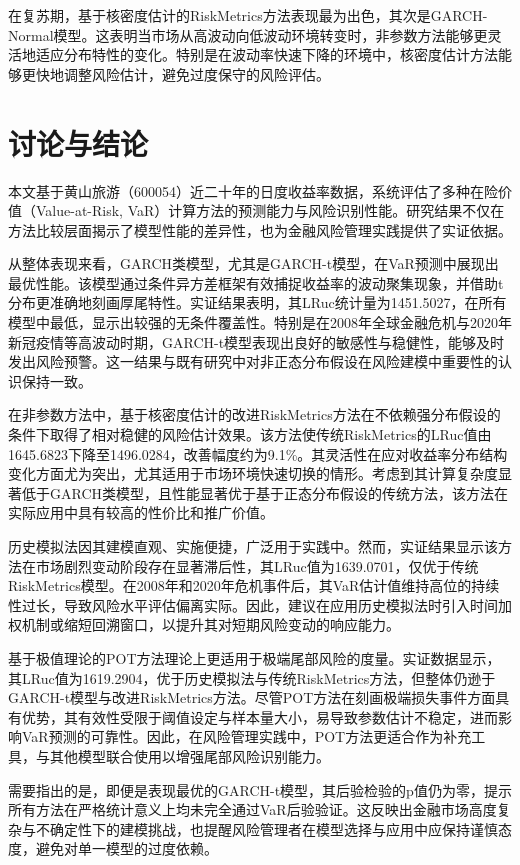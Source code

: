 \documentclass[12pt, a4paper]{article}
\begin{document}
在复苏期，基于核密度估计的RiskMetrics方法表现最为出色，其次是GARCH-Normal模型。这表明当市场从高波动向低波动环境转变时，非参数方法能够更灵活地适应分布特性的变化。特别是在波动率快速下降的环境中，核密度估计方法能够更快地调整风险估计，避免过度保守的风险评估。

\section{讨论与结论}

本文基于黄山旅游（600054）近二十年的日度收益率数据，系统评估了多种在险价值（Value-at-Risk, VaR）计算方法的预测能力与风险识别性能。研究结果不仅在方法比较层面揭示了模型性能的差异性，也为金融风险管理实践提供了实证依据。

从整体表现来看，GARCH类模型，尤其是GARCH-t模型，在VaR预测中展现出最优性能。该模型通过条件异方差框架有效捕捉收益率的波动聚集现象，并借助t分布更准确地刻画厚尾特性。实证结果表明，其LRuc统计量为1451.5027，在所有模型中最低，显示出较强的无条件覆盖性。特别是在2008年全球金融危机与2020年新冠疫情等高波动时期，GARCH-t模型表现出良好的敏感性与稳健性，能够及时发出风险预警。这一结果与既有研究中对非正态分布假设在风险建模中重要性的认识保持一致。

在非参数方法中，基于核密度估计的改进RiskMetrics方法在不依赖强分布假设的条件下取得了相对稳健的风险估计效果。该方法使传统RiskMetrics的LRuc值由1645.6823下降至1496.0284，改善幅度约为9.1\%。其灵活性在应对收益率分布结构变化方面尤为突出，尤其适用于市场环境快速切换的情形。考虑到其计算复杂度显著低于GARCH类模型，且性能显著优于基于正态分布假设的传统方法，该方法在实际应用中具有较高的性价比和推广价值。

历史模拟法因其建模直观、实施便捷，广泛用于实践中。然而，实证结果显示该方法在市场剧烈变动阶段存在显著滞后性，其LRuc值为1639.0701，仅优于传统RiskMetrics模型。在2008年和2020年危机事件后，其VaR估计值维持高位的持续性过长，导致风险水平评估偏离实际。因此，建议在应用历史模拟法时引入时间加权机制或缩短回溯窗口，以提升其对短期风险变动的响应能力。

基于极值理论的POT方法理论上更适用于极端尾部风险的度量。实证数据显示，其LRuc值为1619.2904，优于历史模拟法与传统RiskMetrics方法，但整体仍逊于GARCH-t模型与改进RiskMetrics方法。尽管POT方法在刻画极端损失事件方面具有优势，其有效性受限于阈值设定与样本量大小，易导致参数估计不稳定，进而影响VaR预测的可靠性。因此，在风险管理实践中，POT方法更适合作为补充工具，与其他模型联合使用以增强尾部风险识别能力。

需要指出的是，即便是表现最优的GARCH-t模型，其后验检验的p值仍为零，提示所有方法在严格统计意义上均未完全通过VaR后验验证。这反映出金融市场高度复杂与不确定性下的建模挑战，也提醒风险管理者在模型选择与应用中应保持谨慎态度，避免对单一模型的过度依赖。
\end{document}
